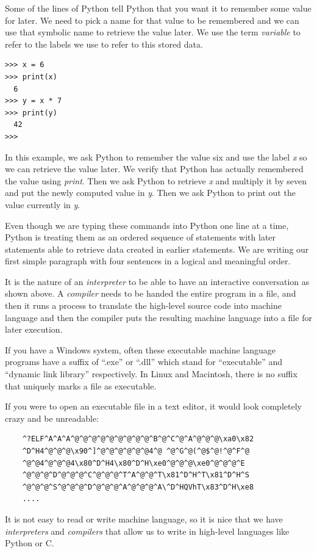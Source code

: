 Some of the lines of Python tell Python that you want it to remember some value for later. We need to pick a name for that value to be remembered and we can use that symbolic name to retrieve the value later. We use the term \emph{variable} to refer to the labels we use to refer to this stored data.

\begin{Verbatim}[frame=single]
>>> x = 6
>>> print(x)
  6
>>> y = x * 7
>>> print(y)
  42
>>>
\end{Verbatim}
In this example, we ask Python to remember the value six and use the label \emph{x} so we can retrieve the value later. We verify that Python has actually remembered the value using \emph{print}. Then we ask Python to retrieve \emph{x} and multiply it by seven and put the newly computed value in \emph{y}. Then we ask Python to print out the value currently in \emph{y}.

Even though we are typing these commands into Python one line at a time, Python is treating them as an ordered sequence of statements with later statements able to retrieve data created in earlier statements. We are writing our first simple paragraph with four sentences in a logical and meaningful order.

It is the nature of an \emph{interpreter} to be able to have an interactive conversation as shown above. A \emph{compiler} needs to be handed the entire program in a file, and then it runs a process to translate the high-level source code into machine language and then the compiler puts the resulting machine language into a file for later execution.

If you have a Windows system, often these executable machine language programs have a suffix of ``.exe'' or ``.dll'' which stand for ``executable'' and ``dynamic link library'' respectively. In Linux and Macintosh, there is no suffix that uniquely marks a file as executable.

If you were to open an executable file in a text editor, it would look completely crazy and be unreadable:

\begin{verbatim}
    ^?ELF^A^A^A^@^@^@^@^@^@^@^@^@^B^@^C^@^A^@^@^@\xa0\x82
    ^D^H4^@^@^@\x90^]^@^@^@^@^@^@4^@ ^@^G^@(^@$^@!^@^F^@
    ^@^@4^@^@^@4\x80^D^H4\x80^D^H\xe0^@^@^@\xe0^@^@^@^E
    ^@^@^@^D^@^@^@^C^@^@^@^T^A^@^@^T\x81^D^H^T\x81^D^H^S
    ^@^@^@^S^@^@^@^D^@^@^@^A^@^@^@^A\^D^HQVhT\x83^D^H\xe8
    ....
\end{verbatim}

It is not easy to read or write machine language, so it is nice that we have \emph{interpreters} and \emph{compilers} that allow us to write in high-level languages like Python or C.

